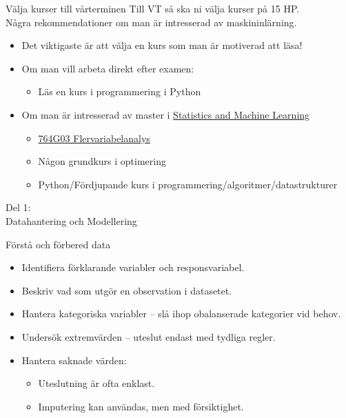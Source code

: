 \documentclass[10pt,english]{beamer}
\begin{document}
\begin{frame}{Välja kurser till vårterminen}
  Till VT så ska ni välja kurser på 15 HP. \\
  Några rekommendationer om man är intresserad av maskininlärning.
  \begin{itemize}
        \item Det viktigaste är att välja en kurs som man är motiverad att läsa!
        \item Om man vill arbeta direkt efter examen: 
        \begin{itemize}
          \item Läs en kurs i programmering i Python
        \end{itemize}
        \item Om man är intresserad av master i \href{https://liu.se/en/education/program/f7mml}{Statistics and Machine Learning}
         \begin{itemize}
          \item \href{https://studieinfo.liu.se/kurs/764G03\#examination}{764G03 Flervariabelanalys}
          \item Någon grundkurs i optimering
          \item Python/Fördjupande kurs i programmering/algoritmer/datastrukturer
        \end{itemize}
    \end{itemize}

\end{frame}


\begin{frame}[standout]
    \LARGE Del 1: \\ Datahantering och Modellering
\end{frame}



\begin{frame}{Förstå och förbered data}
\begin{itemize}
    \item Identifiera förklarande variabler och responsvariabel.
    \item Beskriv vad som utgör en observation i datasetet.
    \item Hantera kategoriska variabler – slå ihop obalanserade kategorier vid behov.
    \item Undersök extremvärden – uteslut endast med tydliga regler.
    \item Hantera saknade värden:
    \begin{itemize}
        \item Uteslutning är ofta enklast.
        \item Imputering kan användas, men med försiktighet.
    \end{itemize}
\end{itemize}
\end{frame}
\end{document}
